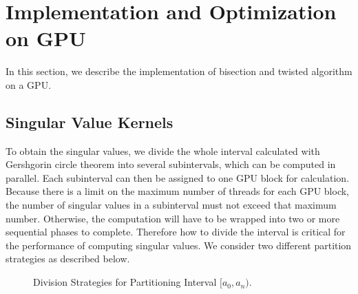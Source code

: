 \section{Implementation and Optimization on GPU}
\label{sec:implementation}
In this section, we describe the implementation of bisection and twisted algorithm on a GPU.


\subsection{Singular Value Kernels}
\label{sec_svalue}
To obtain the singular values, we divide the whole interval calculated with Gershgorin circle theorem into several subintervals, which can be computed in parallel.
Each subinterval can then be assigned to one GPU block for calculation.
Because there is a limit on the maximum number of threads for each GPU block,
the number of singular values in a subinterval must not exceed that maximum number. Otherwise, the computation will have to be wrapped into two or more sequential phases to complete.
Therefore how to divide the interval is critical for the performance of
computing singular values. We consider two different partition
strategies as described below. 
\begin{figure}[hbpt]
\centering
  \caption{Division Strategies for Partitioning Interval  $[a_0, a_n)$.}
\vspace{-0.1in}
\end{figure}

